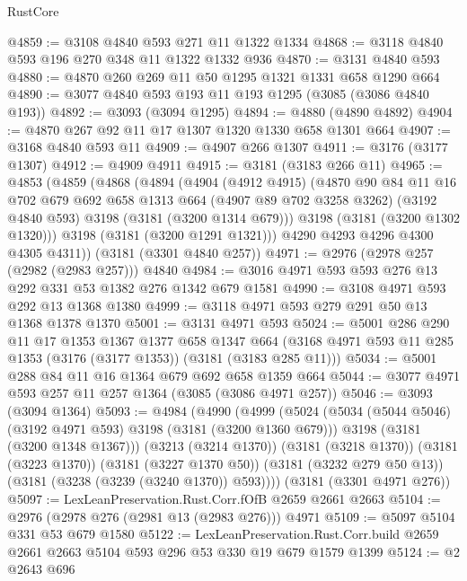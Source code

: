 \begin{lexlean}{RustCore}
\begin{coremodule}
@4859 := @3108 @4840 @593 @271 @11 @1322 @1334
@4868 := @3118 @4840 @593 @196 @270 @348 @11 @1322 @1332 @936
@4870 := @3131 @4840 @593
@4880 := @4870 @260 @269 @11 @50 @1295 @1321 @1331 @658 @1290 @664
@4890 := @3077 @4840 @593 @193 @11 @193 @1295 (@3085 (@3086 @4840 @193))
@4892 := @3093 (@3094 @1295)
@4894 := @4880 (@4890 @4892)
@4904 := @4870 @267 @92 @11 @17 @1307 @1320 @1330 @658 @1301 @664
@4907 := @3168 @4840 @593 @11
@4909 := @4907 @266 @1307
@4911 := @3176 (@3177 @1307)
@4912 := @4909 @4911
@4915 := @3181 (@3183 @266 @11)
@4965 := @4853
    (@4859
      (@4868
        (@4894
          (@4904
            (@4912 @4915)
            (@4870
              @90
              @84
              @11
              @16
              @702
              @679
              @692
              @658
              @1313
              @664
              (@4907 @89 @702 @3258 @3262)
              (@3192 @4840 @593)
              @3198
              (@3181 (@3200 @1314 @679)))
            @3198
            (@3181 (@3200 @1302 @1320)))
          @3198
          (@3181 (@3200 @1291 @1321)))
        @4290
        @4293
        @4296
        @4300
        @4305
        @4311))
    (@3181 (@3301 @4840 @257))
@4971 := @2976 (@2978 @257 (@2982 (@2983 @257))) @4840
@4984 := @3016 @4971 @593 @593 @276 @13 @292 @331 @53 @1382 @276 @1342 @679 @1581
@4990 := @3108 @4971 @593 @292 @13 @1368 @1380
@4999 := @3118 @4971 @593 @279 @291 @50 @13 @1368 @1378 @1370
@5001 := @3131 @4971 @593
@5024 := @5001
    @286
    @290
    @11
    @17
    @1353
    @1367
    @1377
    @658
    @1347
    @664
    (@3168 @4971 @593 @11 @285 @1353 (@3176 (@3177 @1353)) (@3181 (@3183 @285 @11)))
@5034 := @5001 @288 @84 @11 @16 @1364 @679 @692 @658 @1359 @664
@5044 := @3077 @4971 @593 @257 @11 @257 @1364 (@3085 (@3086 @4971 @257))
@5046 := @3093 (@3094 @1364)
@5093 := @4984
    (@4990
      (@4999
        (@5024
          (@5034 (@5044 @5046) (@3192 @4971 @593) @3198 (@3181 (@3200 @1360 @679)))
          @3198
          (@3181 (@3200 @1348 @1367)))
        (@3213 (@3214 @1370))
        (@3181 (@3218 @1370))
        (@3181 (@3223 @1370))
        (@3181 (@3227 @1370 @50))
        (@3181 (@3232 @279 @50 @13))
        (@3181 (@3238 (@3239 (@3240 @1370)) @593))))
    (@3181 (@3301 @4971 @276))
@5097 := LexLeanPreservation.Rust.Corr.fOfB @2659 @2661 @2663
@5104 := @2976 (@2978 @276 (@2981 @13 (@2983 @276))) @4971
@5109 := @5097 @5104 @331 @53 @679 @1580
@5122 := LexLeanPreservation.Rust.Corr.build
    @2659
    @2661
    @2663
    @5104
    @593
    @296
    @53
    @330
    @19
    @679
    @1579
    @1399
@5124 := @2 @2643 @696

\end{coremodule}
\end{lexlean}
